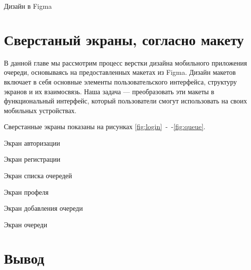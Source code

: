 \begin{image}
	\caption{Дизайн в Figma}
	\label{fig:figma}
\end{image}

\section{Сверстаный экраны, согласно макету}

В данной главе мы рассмотрим процесс верстки дизайна мобильного приложения
очереди, основываясь на предоставленных макетах из Figma.
Дизайн макетов включает в себя основные элементы пользовательского интерфейса,
структуру экранов и их взаимосвязь.
Наша задача --- преобразовать эти макеты в функциональный интерфейс,
который пользователи смогут использовать на своих мобильных устройствах.

Сверстанные экраны показаны на рисунках \ref{fig:login}~-~-\ref{fig:queue}.

\begin{image}
	\caption{Экран авторизации}
	\label{fig:login}
\end{image}

\begin{image}
	\caption{Экран регистрации}
	\label{fig:signup}
\end{image}

\begin{image}
	\caption{Экран списка очередей}
	\label{fig:queue:list}
\end{image}

\begin{image}
	\caption{Экран профеля}
	\label{fig:profile}
\end{image}

\begin{image}
	\caption{Экран добавления очереди}
	\label{fig:queue:add}
\end{image}

\begin{image}
	\caption{Экран очереди}
	\label{fig:queue}
\end{image}

\clearpage

\section*{\LARGE Вывод}



